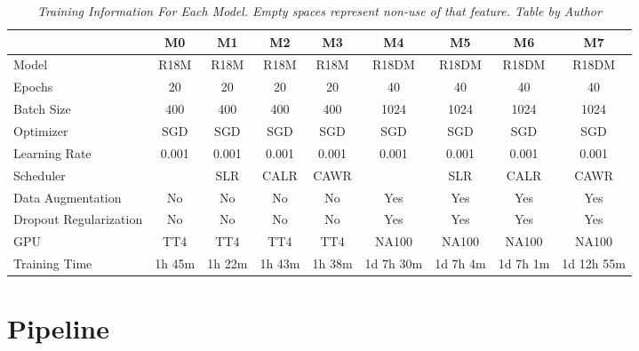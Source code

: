 \begin{landscape}

  \begin{table}
    \centering
    \begin{tabular}{lcccccccc}
      \toprule
      & M0 & M1 & M2 & M3 & M4 & M5 & M6 & M7 \\
      \midrule
      Model & R18M & R18M & R18M & R18M & R18DM & R18DM & R18DM & R18DM \\
      Epochs & 20 & 20 & 20 & 20 & 40 & 40 & 40 & 40 \\
      Batch Size & 400 & 400 & 400 & 400 & 1024 & 1024 & 1024 & 1024 \\
      Optimizer & SGD & SGD & SGD & SGD & SGD & SGD & SGD & SGD \\
      Learning Rate & 0.001 & 0.001 & 0.001 & 0.001 & 0.001 & 0.001 & 0.001 & 0.001 \\
      Scheduler & & SLR & CALR & CAWR &  & SLR & CALR & CAWR  \\
      Data Augmentation & No & No & No & No  & Yes & Yes & Yes & Yes \\
      Dropout Regularization & No & No & No & No  & Yes & Yes & Yes & Yes \\
      GPU & TT4 & TT4 & TT4 & TT4 & NA100 & NA100 & NA100 & NA100 \\
      Training Time & 1h 45m & 1h 22m & 1h 43m & 1h 38m & 1d 7h 30m & 1d 7h 4m & 1d 7h 1m & 1d 12h 55m \\ \bottomrule
    \end{tabular}
    \caption[Training Information For Each Model.]
    {\textit{Training Information For Each Model. Empty spaces represent non-use of that feature.
    Table by Author}}
    {\label{table:trained-models-information}}
  \end{table}
\end{landscape}


\newpage

\section{Pipeline}

